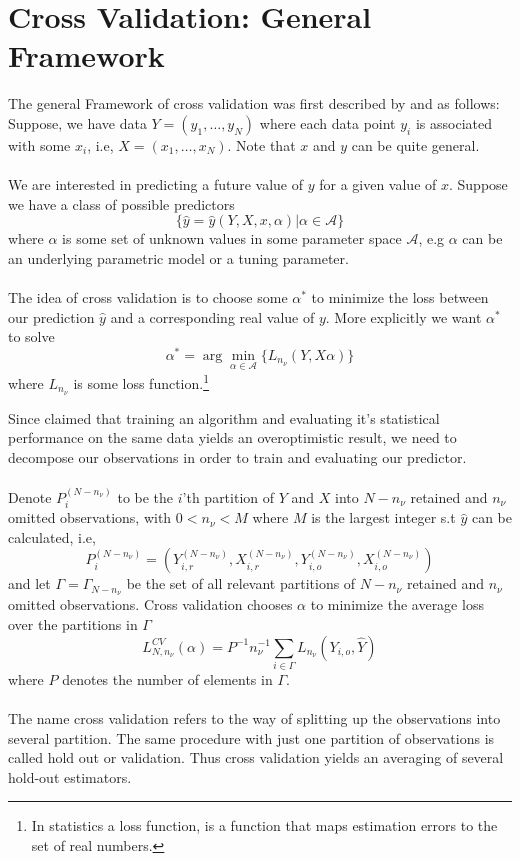\documentclass[Research_Module_ES.tex]{subfiles}
\begin{document}
\section{Cross Validation: General Framework}
The general Framework of cross validation was first described by \cite{stone1974cross} and  \cite{geisser1975predictive} as follows: \\

Suppose, we have data $Y=(y_1,\ldots,y_N)$ where each data point $y_i$ is associated with some $x_i$, i.e, $X=(x_1,\ldots,x_N)$. Note that $x$ and $y$ can be quite general.\\
\\
We are interested in predicting a future value of $y$ for a given value of $x$. Suppose we have a class of possible predictors 
\[
	\{\hat{y}=\hat{y}(Y,X,x,\alpha)|\alpha\in\mathscr{A}\}
\]
where $\alpha$ is some set of unknown values in some parameter space $\mathscr{A}$, e.g $\alpha$ can be an underlying parametric model or a tuning parameter.\\
\\
The idea of cross validation is to choose some $\alpha^\ast$ to minimize the loss between our prediction $\hat{y}$ and a corresponding real value of $y$. More explicitly we want $\alpha^\ast$ to solve
\[
	\alpha^\ast=\arg\min_{\alpha\in\mathscr{A}}\{L_{n_\nu}(Y,X\alpha)\}
\]
where $L_{n_\nu}$ is some loss function.\footnote{In statistics a loss function, is a function that maps estimation errors to the set of real numbers.  }
 
Since \cite{larson1931shrinkage} claimed that training an algorithm and evaluating it's statistical performance on the same data yields an overoptimistic result, we need to decompose our observations in order to train and evaluating our predictor. \\
\\
Denote $P^{(N-n_\nu)}_i$ to be the $i$'th partition of $Y$ and $X$ into $N-n_\nu$ retained and $n_\nu$ omitted observations, with $0<n_\nu<M$ where $M$ is the largest integer s.t $\hat{y}$ can be calculated, i.e,
\[
	P^{(N-n_\nu)}_i=(Y_{i,r}^{(N-n_\nu)},X_{i,r}^{(N-n_\nu)},Y_{i,o}^{(N-n_\nu)},X_{i,o}^{(N-n_\nu)})
\]
and let $\Gamma=\Gamma_{N-n_\nu}$ be the set of all relevant partitions of $N-n_\nu$ retained and $n_\nu$ omitted observations. Cross validation chooses $\alpha$ to minimize the average loss over the partitions in $\Gamma$ 
\[
	L_{N,n_\nu}^{CV}(\alpha)=P^{-1}n_\nu^{-1}\sum_{i\in\Gamma}L_{n_\nu}(Y_{i,o},\hat{Y})
\]
where $P$ denotes the number of elements in $\Gamma$.\\
\\
The name cross validation refers to the way of splitting up the observations into several partition. The same procedure with just one partition of observations is called hold out or validation. Thus cross validation yields an averaging of several hold-out estimators.
\end{document}
